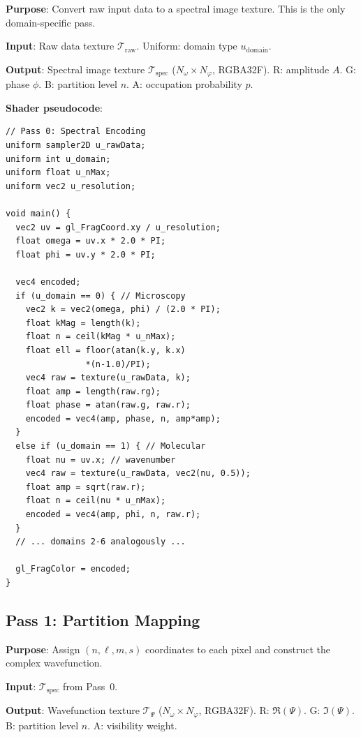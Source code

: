\documentclass[11pt,twocolumn,a4paper]{article}
\begin{document}
\textbf{Purpose}: Convert raw input data to a spectral image texture.
This is the only domain-specific pass.

\textbf{Input}: Raw data texture $\mathcal{T}_{\text{raw}}$.
Uniform: domain type $u_{\text{domain}}$.

\textbf{Output}: Spectral image texture $\mathcal{T}_{\text{spec}}$
($N_\omega \times N_\varphi$, RGBA32F).
R: amplitude $A$. G: phase $\phi$. B: partition level $n$. A: occupation
probability $p$.

\textbf{Shader pseudocode}:
\begin{lstlisting}[style=glsl]
// Pass 0: Spectral Encoding
uniform sampler2D u_rawData;
uniform int u_domain;
uniform float u_nMax;
uniform vec2 u_resolution;

void main() {
  vec2 uv = gl_FragCoord.xy / u_resolution;
  float omega = uv.x * 2.0 * PI;
  float phi = uv.y * 2.0 * PI;

  vec4 encoded;
  if (u_domain == 0) { // Microscopy
    vec2 k = vec2(omega, phi) / (2.0 * PI);
    float kMag = length(k);
    float n = ceil(kMag * u_nMax);
    float ell = floor(atan(k.y, k.x)
                *(n-1.0)/PI);
    vec4 raw = texture(u_rawData, k);
    float amp = length(raw.rg);
    float phase = atan(raw.g, raw.r);
    encoded = vec4(amp, phase, n, amp*amp);
  }
  else if (u_domain == 1) { // Molecular
    float nu = uv.x; // wavenumber
    vec4 raw = texture(u_rawData, vec2(nu, 0.5));
    float amp = sqrt(raw.r);
    float n = ceil(nu * u_nMax);
    encoded = vec4(amp, phi, n, raw.r);
  }
  // ... domains 2-6 analogously ...

  gl_FragColor = encoded;
}
\end{lstlisting}

\subsection{Pass 1: Partition Mapping}
\label{subsec:pass1}

\textbf{Purpose}: Assign $(n, \ell, m, s)$ coordinates to each pixel
and construct the complex wavefunction.

\textbf{Input}: $\mathcal{T}_{\text{spec}}$ from Pass~0.

\textbf{Output}: Wavefunction texture $\mathcal{T}_{\Psi}$
($N_\omega \times N_\varphi$, RGBA32F).
R: $\Re(\Psi)$. G: $\Im(\Psi)$. B: partition level $n$. A: visibility
weight.
\end{document}
